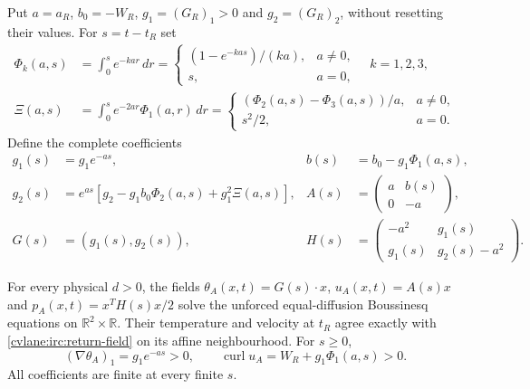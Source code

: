 Put $a=a_R$, $b_0=-W_R$, $g_1=(G_R)_1>0$ and
$g_2=(G_R)_2$, without resetting their values.  For $s=t-t_R$ set
\begin{align}
 \Phi_k(a,s)&=\int_0^s e^{-ka r}\,dr
 =\begin{cases}(1-e^{-ka s})/(ka),&a\ne0,\\s,&a=0,\end{cases}
 \quad k=1,2,3,\nonumber\\
 \Xi(a,s)&=\int_0^s e^{-2ar}\Phi_1(a,r)\,dr
 =\begin{cases}(\Phi_2(a,s)-\Phi_3(a,s))/a,&a\ne0,\\
 s^2/2,&a=0.\end{cases}
 \label{cvlane:irc:affine-integrals}
\end{align}
Define the complete coefficients
\begin{equation}\label{cvlane:irc:affine-solution}
 \begin{aligned}
 g_1(s)&=g_1e^{-as},&
 b(s)&=b_0-g_1\Phi_1(a,s),\\
 g_2(s)&=e^{as}\left[g_2-g_1b_0\Phi_2(a,s)
                              +g_1^2\Xi(a,s)\right],&
 A(s)&=\begin{pmatrix}a&b(s)\\0&-a\end{pmatrix},\\
 G(s)&=(g_1(s),g_2(s)),&
 H(s)&=\begin{pmatrix}-a^2&g_1(s)\\g_1(s)&g_2(s)-a^2\end{pmatrix}.
 \end{aligned}
\end{equation}

\begin{cvlanetheorem}\label{cvlane:irc:affine-continuation}
For every physical $d>0$, the fields
$\theta_A(x,t)=G(s)\cdot x$, $u_A(x,t)=A(s)x$ and
$p_A(x,t)=x^TH(s)x/2$ solve the unforced equal-diffusion
Boussinesq equations on $\mathbb R^2\times\mathbb R$.
Their temperature and velocity at $t_R$ agree exactly with
\eqref{cvlane:irc:return-field} on its affine neighbourhood.
For $s\geq0$,
\[
 (\nabla\theta_A)_1=g_1e^{-as}>0,\qquad
 \operatorname{curl}u_A=W_R+g_1\Phi_1(a,s)>0.
\]
All coefficients are finite at every finite $s$.
\end{cvlanetheorem}

